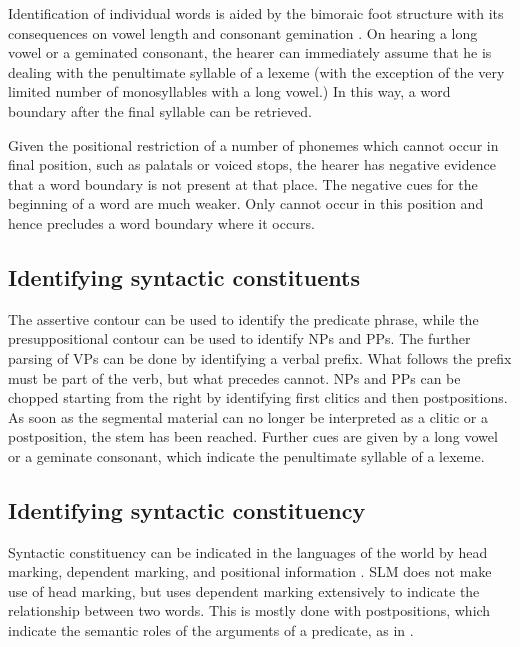 Identification of individual words is aided by the bimoraic foot structure with its consequences on vowel length and consonant gemination . On hearing a long vowel or a geminated consonant, the hearer can immediately assume that he is dealing with the penultimate syllable of a lexeme (with the exception of the very limited number of monosyllables with a long vowel.) In this way, a word boundary after the final syllable can be retrieved.

Given the positional restriction of a number of phonemes which cannot occur in final position, such as palatals or voiced stops, the hearer has negative evidence that a word boundary is not present at that place.  The negative cues for the beginning of a word are much weaker. Only   cannot occur in this position and hence precludes a word boundary where it occurs.


\subsection[Syntactic constituents]{Identifying syntactic constituents}\label{sec:disc:Identifyingsyntacticconstituents}
The assertive contour  can be used to identify the predicate phrase, while the presuppositional contour  can be used to identify NPs and PPs. The further parsing of VPs can be done by identifying a verbal prefix. What follows the prefix must be part of the verb, but what precedes cannot. NPs and PPs can be chopped starting from the right by identifying first clitics and then postpositions. As soon as the segmental material can no longer be interpreted as a clitic or a postposition, the stem has been reached. Further cues are given by a long vowel or a geminate consonant, which indicate the penultimate syllable of a lexeme.


\subsection[Syntactic constituency]{Identifying syntactic constituency}\label{sec:disc:Identifyingsyntacticconstituency}
Syntactic constituency can be indicated in the languages of the world by head marking, dependent marking, and positional information \citep{Nichols1986hmdm}.
SLM does not make use of head marking, but uses dependent marking extensively to indicate the relationship between two words. This is mostly done with postpositions, which indicate the semantic roles of the arguments of a predicate, as in .


